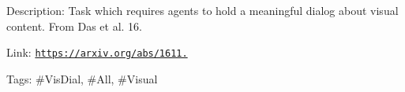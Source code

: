 Description\+: Task which requires agents to hold a meaningful dialog about visual content. From Das et al. \textquotesingle{}16.

Link\+: \href{https://arxiv.org/abs/1611.08669}{\tt https\+://arxiv.\+org/abs/1611.}

Tags\+: \#\+Vis\+Dial, \#\+All, \#\+Visual 